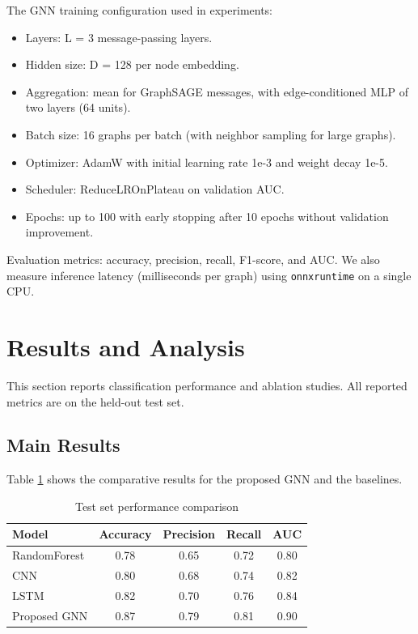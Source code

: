 \documentclass[conference]{IEEEtran}
\begin{document}
The GNN training configuration used in experiments:

\begin{itemize}
	\item Layers: L = 3 message-passing layers.
	\item Hidden size: D = 128 per node embedding.
	\item Aggregation: mean for GraphSAGE messages, with edge-conditioned MLP of two layers (64 units).
	\item Batch size: 16 graphs per batch (with neighbor sampling for large graphs).
	\item Optimizer: AdamW with initial learning rate 1e-3 and weight decay 1e-5.
	\item Scheduler: ReduceLROnPlateau on validation AUC.
	\item Epochs: up to 100 with early stopping after 10 epochs without validation improvement.
\end{itemize}

Evaluation metrics: accuracy, precision, recall, F1-score, and AUC. We also measure inference latency (milliseconds per graph) using \texttt{onnxruntime} on a single CPU.

\section{Results and Analysis}

This section reports classification performance and ablation studies. All reported metrics are on the held-out test set.

\subsection{Main Results}

Table \ref{tab:main_results} shows the comparative results for the proposed GNN and the baselines.

\begin{table}[ht]
\caption{Test set performance comparison}
\label{tab:main_results}
\centering
\begin{tabular}{|l|c|c|c|c|}
\hline
Model & Accuracy & Precision & Recall & AUC \\
\hline
RandomForest & 0.78 & 0.65 & 0.72 & 0.80 \\
CNN & 0.80 & 0.68 & 0.74 & 0.82 \\
LSTM & 0.82 & 0.70 & 0.76 & 0.84 \\
Proposed GNN & 0.87 & 0.79 & 0.81 & 0.90 \\
\hline
\end{tabular}
\end{table}
\end{document}
